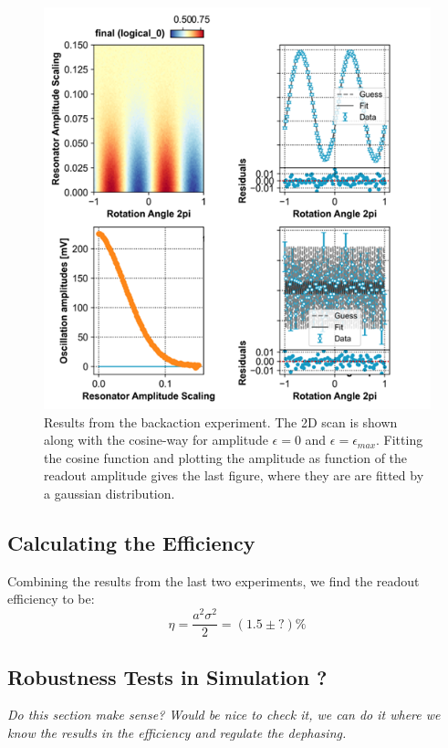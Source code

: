 \begin{figure}
    \centering
    \includegraphics{Figs/calibrations/efficiency/dephasing_result.png}
    \caption{Results from the backaction experiment. The 2D scan is shown along with the cosine-way for amplitude $\epsilon = 0$ and $\epsilon = \epsilon_{max}$. Fitting the cosine function and plotting the amplitude as function of the readout amplitude gives the last figure, where they are are fitted by a gaussian distribution.}
    \label{fig:efficiency_dephasing_result}
\end{figure}


\subsection{Calculating the Efficiency}
Combining the results from the last two experiments, we find the readout efficiency to be:
\begin{equation}
    \eta = \frac{a^2\sigma^2}{2} = (1.5 \pm ?) \% 
\end{equation}

\subsection{Robustness Tests in Simulation ? }
\textit{Do this section make sense? Would be nice to check it, we can do it where we know the results in the efficiency and regulate the dephasing.}




